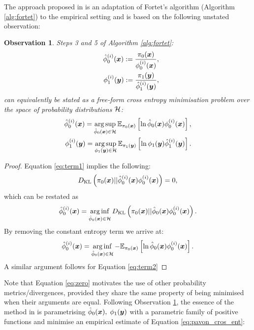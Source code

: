 \documentclass[a4paper,12pt,twoside,openright]{report}
\newtheorem{observation}{Observation}
\theoremstyle{definition}
\begin{document}
The approach proposed in \cite{pavon2018data} is an adaptation of Fortet's algorithm (Algorithm \ref{alg:fortet}) to the empirical setting and is based on the following unstated observation:
\begin{observation}\label{obs:pavon}
Steps 3 and 5 of Algorithm \ref{alg:fortet}:
\begin{align}
    {\hat{\phi}}_0^{(i)}({\bm{x}}) := \frac{\pi_0({\bm{x}})}{\phi_0^{(i)}({\bm{x}})}, \label{eq:term1}\\    \quad \phi_1^{(i)}({\bm{y}}) := \frac{\pi_1({\bm{y}})}{{\hat{\phi}}_1^{(i)}({\bm{y}})} , \label{eq:term2}
\end{align}
can equivalently be stated as a free-form cross entropy minimisation problem over the space of probability distributions ${\mathcal{H}}$:
\begin{align} \label{eq:pavon_cros_ent}
   {\hat{\phi}}_0^{(i)}({\bm{x}})= \operatorname*{arg\,sup}_{{\hat{\phi}}_0({\bm{x}}) \in {\mathcal{H}}} \mathbb{E}_{\pi_0({\bm{x}})} \left[\operatorname{ln} {\hat{\phi}}_0({\bm{x}})   \phi_0^{(i)}({\bm{x}})\right],\\
   \phi_1^{(i)}({\bm{y}})= \operatorname*{arg\,sup}_{\phi_1({\bm{y}}) \in {\mathcal{H}}} \mathbb{E}_{\pi_1({\bm{y}})} \left[\operatorname{ln} \phi_1({\bm{y}})   {\hat{\phi}}_1^{(i)}({\bm{y}})\right].
\end{align}
\end{observation}
\begin{proof}
Equation \ref{eq:term1}  implies the following:
\begin{align}\label{eq:zero}
    D_{\mathrm{KL}}\left(\pi_0({\bm{x}}) || {\hat{\phi}}_0^{(i)}({\bm{x}})   \phi_0^{(i)}({\bm{x}}) \right)  = 0 ,
\end{align} 
which can be restated as
\begin{align}
   {\hat{\phi}}_0^{(i)}({\bm{x}}) = \operatorname*{arg\,inf}_{{\hat{\phi}}_0({\bm{x}})\in \mathcal{H}} D_{\mathrm{KL}}\left(\pi_0({\bm{x}}) || {\hat{\phi}}_0({\bm{x}})   \phi_0^{(i)}({\bm{x}}) \right). 
\end{align} 
By removing the constant entropy term we arrive at:
\begin{align*}
   {\hat{\phi}}_0^{(i)}({\bm{x}})= \operatorname*{arg\,inf}_{{\hat{\phi}}_0({\bm{x}}) \in {\mathcal{H}}} -\mathbb{E}_{\pi_0({\bm{x}})} \left[\operatorname{ln} {\hat{\phi}}_0({\bm{x}})   \phi_0^{(i)}({\bm{x}})\right].
\end{align*}
A similar argument follows for Equation \ref{eq:term2}
\end{proof}
Note that Equation \ref{eq:zero} motivates the use of other probability metrics/divergences, provided they share the same property of being minimised  when their arguments are equal. Following Observation \ref{obs:pavon}, the essence of the method in \cite{pavon2018data} is parametrising  ${\hat{\phi}}_0({\bm{x}}), \;  \phi_1({\bm{y}}) $ with a parametric family of positive functions and minimise an empirical estimate of Equation \ref{eq:pavon_cros_ent}:
\end{document}
